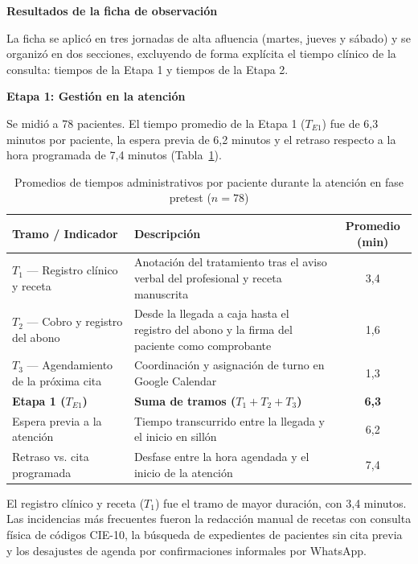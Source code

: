 
\textbf{Resultados de la ficha de observación}

La ficha se aplicó en tres jornadas de alta afluencia (martes, jueves y sábado) y se organizó en dos secciones, excluyendo de forma explícita el tiempo clínico de la consulta: tiempos de la Etapa 1 y tiempos de la Etapa 2.

\textbf{Etapa 1: Gestión en la atención}

Se midió a 78 pacientes. El tiempo promedio de la Etapa 1 ($T_{E1}$) fue de 6{,}3 minutos por paciente, la espera previa de 6{,}2 minutos y el retraso respecto a la hora programada de 7{,}4 minutos (Tabla~\ref{tab:resumen_obs_parte_a}).

\begin{table}[H]
    \centering
    \fontsize{10}{12}\selectfont
    \caption{Promedios de tiempos administrativos por paciente durante la atención en fase pretest ($n = 78$)}
    \label{tab:resumen_obs_parte_a}
    \renewcommand{\arraystretch}{1.2}
    \begin{tabularx}{\linewidth}{|l|X|c|}
        \hline
        \textbf{Tramo / Indicador} & \textbf{Descripción} & \textbf{Promedio (min)} \\ \hline
        $T_1$ — Registro clínico y receta & Anotación del tratamiento tras el aviso verbal del profesional y receta manuscrita & 3,4 \\ \hline
        $T_2$ — Cobro y registro del abono & Desde la llegada a caja hasta el registro del abono y la firma del paciente como comprobante & 1,6 \\ \hline
        $T_3$ — Agendamiento de la próxima cita & Coordinación y asignación de turno en Google Calendar & 1,3 \\ \hline
        \textbf{Etapa 1 ($T_{E1}$)} & \textbf{Suma de tramos ($T_1 + T_2 + T_3$)} & \textbf{6,3} \\ \hline
        Espera previa a la atención & Tiempo transcurrido entre la llegada y el inicio en sillón & 6,2 \\ \hline
        Retraso vs. cita programada & Desfase entre la hora agendada y el inicio de la atención & 7,4 \\ \hline
    \end{tabularx}
\end{table}

El registro clínico y receta ($T_1$) fue el tramo de mayor duración, con 3{,}4 minutos. Las incidencias más frecuentes fueron la redacción manual de recetas con consulta física de códigos CIE-10, la búsqueda de expedientes de pacientes sin cita previa y los desajustes de agenda por confirmaciones informales por WhatsApp.

